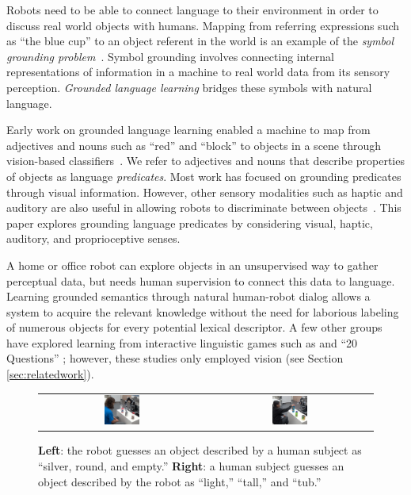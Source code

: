 Robots need to be able to connect language to their environment in order to discuss real world objects with humans.
Mapping from referring expressions such as ``the blue cup'' to an object referent in the world is an example of the \textit{symbol grounding problem}~\cite{harnad:phys90}.
Symbol grounding involves connecting internal representations of information in a machine to real world data from its sensory perception.
\textit{Grounded language learning} bridges these symbols with natural language.

Early work on grounded language learning enabled a machine to map from adjectives and nouns such as ``red'' and ``block'' to objects in a scene through vision-based classifiers~\cite{roy:evocomm01}.
We refer to adjectives and nouns that describe properties of objects as language \textit{predicates}.
Most work has focused on grounding predicates through visual information. However, other sensory modalities such as haptic and auditory are also useful in allowing robots to discriminate between objects~\cite{sinapov:icra14}.
This paper explores grounding language predicates by considering visual, haptic, auditory, and proprioceptive senses. 

A home or office robot can explore objects in an unsupervised way to gather perceptual data, but needs human supervision to connect this data to language.
Learning grounded semantics through natural human-robot dialog allows a system to acquire the relevant knowledge without the need for laborious labeling of numerous objects for every potential lexical descriptor.
A few other groups have explored learning from interactive linguistic games such as \ispy and ``20 Questions'' \cite{parde:ijcai15,vogel:aaai10}; however, these studies only employed vision (see Section \ref{sec:relatedwork}).

\begin{figure}
\centering
\begin{tabular}{cc}
	\includegraphics[width=0.225\textwidth]{figures/silver_round_and_empty_cropped.png} &
	\includegraphics[width=0.225\textwidth]{figures/light_tall_tub_cropped.jpg} \\
\end{tabular}
\caption{\textbf{Left}: the robot guesses an object described by a human subject as ``silver, round, and empty.'' \textbf{Right}: a human subject guesses an object described by the robot as ``light,'' ``tall,'' and ``tub.''}
\label{fig:ispy}
\end{figure}

